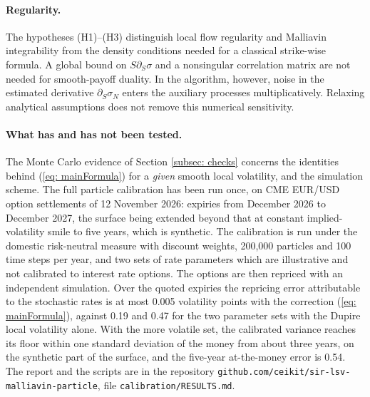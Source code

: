 \paragraph{Regularity.}
The hypotheses (H1)--(H3) distinguish local flow regularity and Malliavin
integrability from the density conditions needed for a classical strike-wise
formula. A global bound on $S\partial_S\sigma$ and a nonsingular correlation
matrix are not needed for smooth-payoff duality. In the algorithm, however,
noise in the estimated derivative $\partial_S\sigma_N$ enters the auxiliary
processes multiplicatively. Relaxing analytical assumptions does not remove
this numerical sensitivity.

\paragraph{What has and has not been tested.} The Monte Carlo evidence of Section \ref{subsec: checks} concerns the identities behind (\ref{eq: mainFormula}) for a \emph{given} smooth local volatility, and the simulation scheme. The full particle calibration has been run once, on CME EUR/USD option settlements of 12 November 2026: expiries from December 2026 to December 2027, the surface being extended beyond that at constant implied-volatility smile to five years, which is synthetic. The calibration is run under the domestic risk-neutral measure with discount weights, 200,000 particles and 100 time steps per year, and two sets of rate parameters which are illustrative and not calibrated to interest rate options. The options are then repriced with an independent simulation. Over the quoted expiries the repricing error attributable to the stochastic rates is at most 0.005 volatility points with the correction (\ref{eq: mainFormula}), against 0.19 and 0.47 for the two parameter sets with the Dupire local volatility alone. With the more volatile set, the calibrated variance reaches its floor within one standard deviation of the money from about three years, on the synthetic part of the surface, and the five-year at-the-money error is 0.54. The report and the scripts are in the repository \texttt{github.com/ceikit/sir-lsv-malliavin-particle}, file \texttt{calibration/RESULTS.md}.

